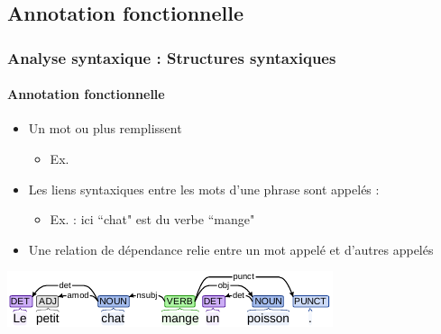 \documentclass[xcolor=table]{beamer}
\begin{document}
\subsection{Annotation fonctionnelle}

\begin{frame}
\frametitle{Analyse syntaxique : Structures syntaxiques}
\framesubtitle{Annotation fonctionnelle}

\begin{itemize}
	\item Un mot ou plus remplissent 
	\begin{itemize}
		\item Ex. 
	\end{itemize}
	\item Les liens syntaxiques entre les mots d'une phrase sont appelés : 
	\begin{itemize}
		\item Ex.  : ici ``chat" est  du verbe ``mange"
	\end{itemize}
	\item Une relation de dépendance relie entre un mot appelé  et d'autres appelés 
\end{itemize}

\includegraphics[width=\textwidth]{../img/intro/gram-dep_.pdf}

\end{frame}
\end{document}
